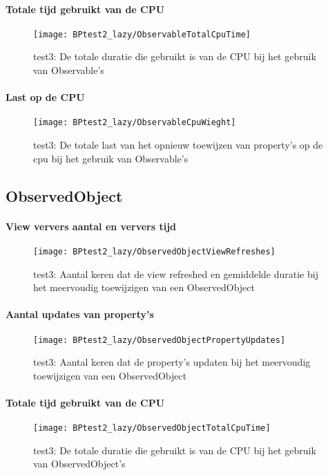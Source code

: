 \paragraph{Totale tijd gebruikt van de CPU}
\begin{figure}[H]
    \centering
    \texttt{[image: BPtest2\_lazy/ObservableTotalCpuTime]} 
    \caption{test3: De totale duratie die gebruikt is van de CPU bij het gebruik van Observable's}
    \label{fig:cpuUsageTimeObservable2}
\end{figure}
\paragraph{Last op de CPU}
\begin{figure}[H]
    \centering
    \texttt{[image: BPtest2\_lazy/ObservableCpuWieght]} 
    \caption{test3: De totale last van het opnieuw toewijzen van property's op de cpu bij het gebruik van Observable's}
    \label{fig:cpuWeightObservable2}
\end{figure}

\subsection{ObservedObject}
\paragraph{View ververs aantal en ververs tijd}
\begin{figure}[H]
    \centering
    \texttt{[image: BPtest2\_lazy/ObservedObjectViewRefreshes]} 
    \caption{test3: Aantal keren dat de view refreshed en gemiddelde duratie bij het meervoudig toewijzigen van een ObservedObject}
    \label{fig:viewRefreshesObservedObject2}
\end{figure}
\paragraph{Aantal updates van property's}
\begin{figure}[H]
    \centering
    \texttt{[image: BPtest2\_lazy/ObservedObjectPropertyUpdates]} 
    \caption{test3: Aantal keren dat de property's updaten bij het meervoudig toewijzigen van een ObservedObject}
    \label{fig:propertyUpdatesObservedObject2}
\end{figure}
\paragraph{Totale tijd gebruikt van de CPU}
\begin{figure}[H]
    \centering
    \texttt{[image: BPtest2\_lazy/ObservedObjectTotalCpuTime]} 
    \caption{test3: De totale duratie die gebruikt is van de CPU bij het gebruik van ObservedObject's}
    \label{fig:cpuUsageTimeObservedObject2}
\end{figure}
